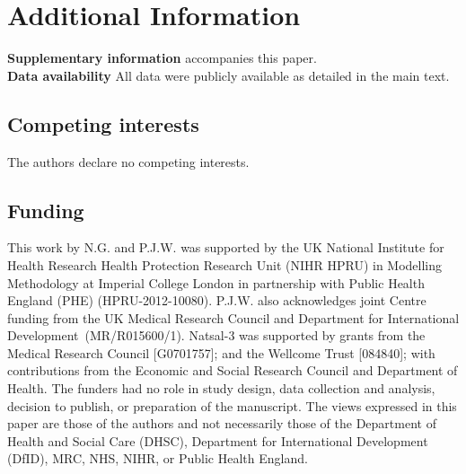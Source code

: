 \documentclass[fleqn,10pt]{wlscirep}
\begin{document}
\section*{Additional Information}
{\bf Supplementary information} accompanies this paper.\\
{\bf Data availability} All data were publicly available as detailed in the main text.

\subsection*{Competing interests}
The authors declare no competing interests.

\subsection*{Funding}
This work by N.G. and P.J.W. was supported by the UK National Institute for Health Research Health Protection Research Unit (NIHR HPRU) in Modelling Methodology at Imperial College London in partnership with Public Health England (PHE) (HPRU-2012-10080). P.J.W. also acknowledges joint Centre funding from the UK Medical Research Council and Department for International Development~(MR/R015600/1). Natsal-3 was supported by grants from the Medical Research Council [G0701757]; and the Wellcome Trust [084840]; with contributions from the Economic and Social Research Council and Department of Health.
The funders had no role in study design, data collection and analysis, decision to publish, or preparation of the manuscript. The views expressed in this paper are those of the authors and not necessarily those of the Department of Health and Social Care (DHSC), Department for International Development (DfID), MRC, NHS, NIHR, or Public Health England. 
\end{document}
